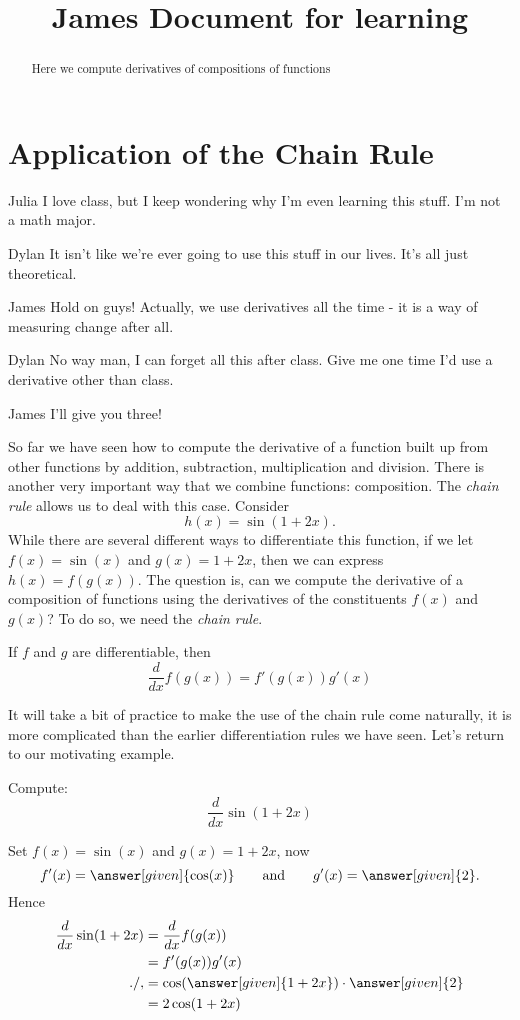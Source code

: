 \documentclass{ximera}
\begin{document}
\title{James Document for learning}
\section{Application of the Chain Rule}

\begin{abstract}
Here we compute derivatives of compositions of functions
\end{abstract}

\begin{dialogue}
\item[Julia] I love class, but I keep wondering why I'm even learning this stuff. I'm not a math major.
\item[Dylan] It isn't like we're ever going to use this stuff in our lives. It's all just theoretical.
\item[James] Hold on guys! Actually, we use derivatives all the time - it is a way of measuring change after all.
\item[Dylan] No way man, I can forget all this after class. Give me one time I'd use a derivative other than class.
\item[James] I'll give you three!
\end{dialogue}


So far we have seen how to compute the derivative of a function built up from other functions by addition, subtraction, multiplication and division. There is another very important way that we combine functions: composition. The \textit{chain rule} allows us to deal with this case. Consider
\[
h(x) = \sin(1+2x).
\] 
While there are several different ways to differentiate this function, if we let $f(x) = \sin(x)$ and $g(x) = 1+2x$, then we can express $h(x) = f(g(x))$. The question is, can we compute the derivative of a composition of functions using the derivatives of the constituents $f(x)$ and $g(x)$? To do so, we need the \textit{chain rule}.


\begin{theorem}
If $f$ and $g$ are differentiable, then
\[
\dfrac{d}{dx} f(g(x)) = f'(g(x))g'(x)
\]
\end{theorem}


It will take a bit of practice to make the use of the chain rule come
naturally, it is more complicated than the earlier differentiation
rules we have seen. Let's return to our motivating example.

\begin{example}
Compute:
\[
\dfrac{d}{dx} \sin(1+2x)
\]

\begin{explanation}
Set $f(x) = \sin(x)$ and $g(x) = 1+2x$, now
\[
f'(x) = \answer[given]{\cos(x)} \qquad\text{and}\qquad g'(x) = \answer[given]{2}.
\]
Hence
\begin{align*}
\dfrac{d}{dx} \sin(1+2x) &= \dfrac{d}{dx} f(g(x)) \\
 &=f'(g(x))g'(x) \\./,
 &= \cos(\answer[given]{1+2x})\cdot \answer[given]{2} \\
 &= 2\cos(1+2x)
\end{align*}
\end{explanation}
\end{example}
\end{document}
